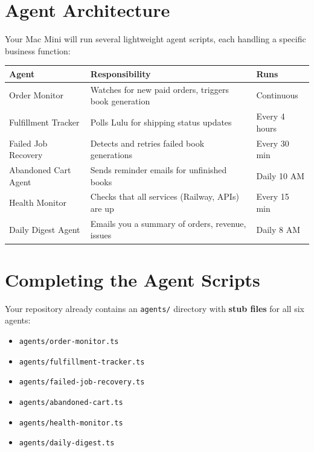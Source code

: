 \documentclass[12pt, letterpaper, oneside]{book}
\begin{document}
\section{Agent Architecture}

Your Mac Mini will run several lightweight agent scripts, each handling a specific business function:

\begin{table}[H]
\centering
\small
\begin{tabularx}{\textwidth}{lXl}
\toprule
\textbf{Agent} & \textbf{Responsibility} & \textbf{Runs} \\
\midrule
Order Monitor & Watches for new paid orders, triggers book generation & Continuous \\
Fulfillment Tracker & Polls Lulu for shipping status updates & Every 4 hours \\
Failed Job Recovery & Detects and retries failed book generations & Every 30 min \\
Abandoned Cart Agent & Sends reminder emails for unfinished books & Daily 10 AM \\
Health Monitor & Checks that all services (Railway, APIs) are up & Every 15 min \\
Daily Digest Agent & Emails you a summary of orders, revenue, issues & Daily 8 AM \\
\bottomrule
\end{tabularx}
\end{table}

\section{Completing the Agent Scripts}

Your repository already contains an \texttt{agents/} directory with \textbf{stub files} for all six agents:

\begin{itemize}[leftmargin=2em, itemsep=2pt]
  \item \texttt{agents/order-monitor.ts}
  \item \texttt{agents/fulfillment-tracker.ts}
  \item \texttt{agents/failed-job-recovery.ts}
  \item \texttt{agents/abandoned-cart.ts}
  \item \texttt{agents/health-monitor.ts}
  \item \texttt{agents/daily-digest.ts}
\end{itemize}
\end{document}
